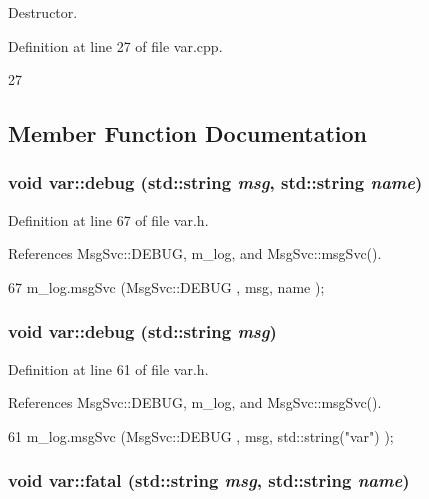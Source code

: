 Destructor. 

Definition at line 27 of file var.cpp.


\begin{DoxyCode}
27 {} 
\end{DoxyCode}


\subsection{Member Function Documentation}
\hypertarget{classvar_afe9c80c1fab5c210a628bb29df513935}{
\subsubsection[{debug}]{\setlength{\rightskip}{0pt plus 5cm}void var::debug (std::string {\em msg}, \/  std::string {\em name})}}
\label{classvar_afe9c80c1fab5c210a628bb29df513935}


Definition at line 67 of file var.h.

References MsgSvc::DEBUG, m\_\-log, and MsgSvc::msgSvc().


\begin{DoxyCode}
67 { m_log.msgSvc (MsgSvc::DEBUG   , msg, name ); }
\end{DoxyCode}
\hypertarget{classvar_a90d3b799c7953db985d7488de79e247d}{
\subsubsection[{debug}]{\setlength{\rightskip}{0pt plus 5cm}void var::debug (std::string {\em msg})}}
\label{classvar_a90d3b799c7953db985d7488de79e247d}


Definition at line 61 of file var.h.

References MsgSvc::DEBUG, m\_\-log, and MsgSvc::msgSvc().


\begin{DoxyCode}
61 { m_log.msgSvc (MsgSvc::DEBUG   , msg, std::string("var") ); }
\end{DoxyCode}
\hypertarget{classvar_af190a03a038835391edf1b1173e117ab}{
\subsubsection[{fatal}]{\setlength{\rightskip}{0pt plus 5cm}void var::fatal (std::string {\em msg}, \/  std::string {\em name})}}
\label{classvar_af190a03a038835391edf1b1173e117ab}


